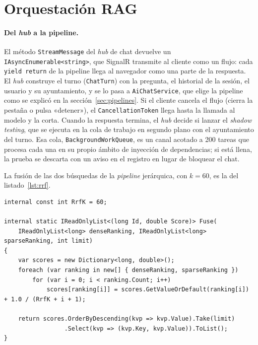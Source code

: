 \section{Orquestación RAG}
\label{sec:impl-rag-detalle}

\paragraph{Del \emph{hub} a la pipeline.} El método \texttt{StreamMessage} del \emph{hub} de chat devuelve un \texttt{IAsyncEnumerable<string>}, que SignalR \cite{signalr} transmite al cliente como un flujo: cada \texttt{yield return} de la pipeline llega al navegador como una parte de la respuesta. El \emph{hub} construye el turno (\texttt{ChatTurn}) con la pregunta, el historial de la sesión, el usuario y su ayuntamiento, y se lo pasa a \texttt{AiChatService}, que elige la pipeline como se explicó en la sección~\ref{sec:pipelines}. Si el cliente cancela el flujo (cierra la pestaña o pulsa «detener»), el \texttt{CancellationToken} llega hasta la llamada al modelo y la corta. Cuando la respuesta termina, el \emph{hub} decide si lanzar el \emph{shadow testing}, que se ejecuta en la cola de trabajo en segundo plano con el ayuntamiento del turno. Esa cola, \texttt{BackgroundWorkQueue}, es un canal acotado a 200 tareas que procesa cada una en su propio ámbito de inyección de dependencias; si está llena, la prueba se descarta con un aviso en el registro en lugar de bloquear el chat.

La fusión de las dos búsquedas de la \emph{pipeline} jerárquica, con $k=60$, es la del listado~\ref{lst:rrf}.

\begin{lstlisting}[language={[Sharp]C},caption={Fusión RRF de las dos búsquedas (\texttt{HybridRetrievalService})},label={lst:rrf}]
internal const int RrfK = 60;

internal static IReadOnlyList<(long Id, double Score)> Fuse(
    IReadOnlyList<long> denseRanking, IReadOnlyList<long> sparseRanking, int limit)
{
    var scores = new Dictionary<long, double>();
    foreach (var ranking in new[] { denseRanking, sparseRanking })
        for (var i = 0; i < ranking.Count; i++)
            scores[ranking[i]] = scores.GetValueOrDefault(ranking[i]) + 1.0 / (RrfK + i + 1);

    return scores.OrderByDescending(kvp => kvp.Value).Take(limit)
                 .Select(kvp => (kvp.Key, kvp.Value)).ToList();
}
\end{lstlisting}


